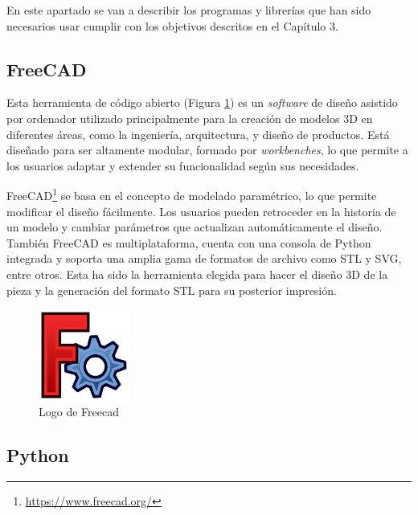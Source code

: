 En este apartado se van a describir los programas y librerías que han sido necesarios usar cumplir con los objetivos descritos en el Capítulo 3.

\subsection{FreeCAD}

Esta herramienta de código abierto (Figura \ref{fig:freecad}) es un \textit{software} de diseño asistido por ordenador utilizado principalmente para la creación de modelos 3D en diferentes áreas, como la ingeniería, arquitectura, y diseño de productos. Está diseñado para ser altamente modular, formado por \textit{workbenches}, lo que permite a los usuarios adaptar y extender su funcionalidad según sus necesidades.

FreeCAD\footnote{\url{https://www.freecad.org/}} se basa en el concepto de modelado paramétrico, lo que permite modificar el diseño fácilmente. Los usuarios pueden retroceder en la historia de un modelo y cambiar parámetros que actualizan automáticamente el diseño. También FreeCAD es multiplataforma, cuenta con una consola de Python integrada y soporta una amplia gama de formatos de archivo como STL y SVG, entre otros. Esta ha sido la herramienta elegida para hacer el diseño 3D de la pieza y la generación del formato STL para su posterior impresión. 

\begin{figure} [h!]
	\begin{center}
		\includegraphics[width=3cm]{figs/freecad.png}
	\end{center}
	\caption{Logo de Freecad} %
	\label{fig:freecad}
\end{figure}


\subsection{Python}


